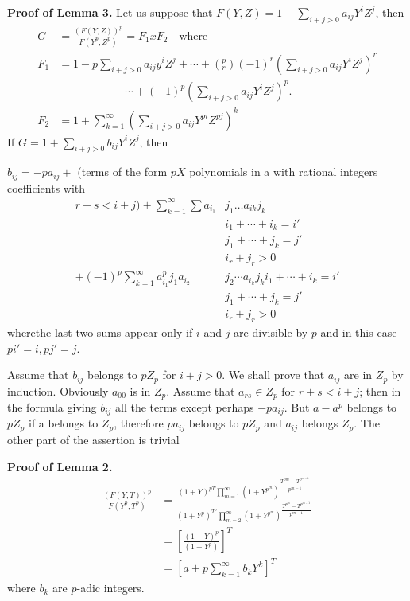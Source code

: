 \noindent \textbf{Proof of Lemma 3.}
Let us suppose that $F(Y,Z)=1- \sum\limits_{i+j>0} a_{ij}Y^i Z^j$,  then  
\begin{align*}
  G&= \frac{(F(Y,Z))^p}{F(Y^p,Z^p)} = F_1 x F_2  \quad \text{where} \\
  F_1 &= 1-p \sum\limits_{i+j>0} a_{ij}y^i Z^j +\cdots+ (^p_r)(-1)^r
  \left(\sum\limits_{i+j>0} a_{ij} Y^i Z^j\right)^r \\ 
  & \hspace{2cm}+ \cdots +(-1)^p \left(\sum\limits_{i+j>0} a_{ij}Y^i
  Z^j\right)^p.\\ 
  F_2 &=1 + \sum \limits_{k=1}^{\infty} \left(\sum_{i+j>0}
  a_{ij} Y^{pi}Z^{pj}\right)^k
\end{align*}
If $G=1+ \sum\limits_{i+j>0} b_{ij}Y^i Z^j$, then 

$b_{ij}= -pa_{ij}+$ (terms of the form $p X$ polynomials in a with
rational integers coefficients with  
\begin{align*}
  r+s <  i+  j) + \sum \limits_{k=1}^\infty \sum a_{i_1}& j_1 \ldots a_{ik}j_k\\
   & i_1 + \cdots + i_k  =i'\\
   &  j_1 + \cdots +j_k  = j'\\
   & i_r + j_r > 0\\
   + (-1)^p \sum \limits_{k=1}^\infty a^p_{i_1}j_1 a_{i_2} & j_2
   \cdots a_{i_k} j_k  i_1 + \cdots + i_k =i'\\
   & j_1 +\cdots + j_k =j'\\ 
   & i_r + j_r >  0
\end{align*}
where\pageoriginale the last two sums appear only if $i$ and $j$ are divisible by
$p$ and in this case $p i' = i, p j' =j$.

Assume that $b_{ij}$ belongs to $p Z_p$ for $i+ j > 0$. We shall prove
that $a_{ij}$ are in $Z_p$ by induction. Obviously $a_{00}$ is in
$Z_p$. Assume that $a_{rs}\in Z_p$ for $r+s < i+j$;  then in the
formula giving $b_{ij}$ all the terms except perhaps $- pa_{ij}$.  But
$a- a^p$ belongs to $p Z_p$ if a belongs  to $Z_p$, therefore
$pa_{ij}$ belongs to $p Z_p$ and $a_{ij}$ belongs $Z_p$. The other
part of the assertion  is trivial 

\textbf{Proof of Lemma 2.}
\begin{align*}
  \frac{(F(Y,T))^p}{F(Y^p, T^p)} & = \frac{(1+Y)^{pT}
  \prod\limits_{m=1}^{\infty} (1+Y^{p^m})^{\dfrac{T^{pm}-
        T^{p^{m-1}}}{p^{m-1}}}}{(1+Y^p)^{T^p}\prod\limits
    _{m=2}^{\infty}(1+Y^{p^m})^{\dfrac{T^{p^m}-
        T^{p^{m-1}}}{p^{m-1}}}}\\ 
  &= \left[\frac{(1+Y)^p}{(1+Y^p)} \right]^T\\
  &= \left[ a+p \sum\limits_{k=1}^\infty b_k Y^k \right]^T
\end{align*}
where $b_k$ are $p$-adic integers. 

